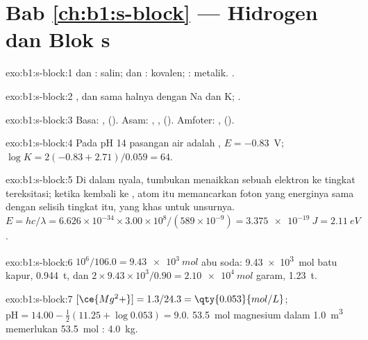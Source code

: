 \section*{Bab \ref{ch:b1:s-block} --- Hidrogen dan Blok s}

\begin{solution}{exo:b1:s-block:1}
 dan : salin;  dan : kovalen;
: metalik. .
\end{solution}

\begin{solution}{exo:b1:s-block:2}
, dan sama halnya dengan Na dan K;
.
\end{solution}

\begin{solution}{exo:b1:s-block:3}
Basa: ,  (). Asam:
, ,  (). Amfoter:
,  ().
\end{solution}

\begin{solution}{exo:b1:s-block:4}
Pada pH 14 pasangan air adalah , $E = -0.83$~V;
$\log K = 2(-0.83 + 2.71)/0.059 = 64$.
\end{solution}

\begin{solution}{exo:b1:s-block:5}
Di dalam nyala, tumbukan menaikkan sebuah elektron ke tingkat tereksitasi;
ketika kembali ke , atom itu memancarkan foton yang
energinya sama dengan selisih tingkat itu, yang khas untuk unsurnya. $E = hc/\lambda = 6.626 \times 10^{-34} \times
3.00 \times 10^8/(589 \times 10^{-9}) = \qty{3.375e-19}{J} = \qty{2.11}{eV}$.
\end{solution}

\begin{solution}{exo:b1:s-block:6}
$10^6/106.0 = \qty{9.43e3}{mol}$ abu soda: \qty{9.43e3}{mol} batu kapur,
\qty{0.944}{t}, dan $2 \times 9.43 \times 10^3/0.90 =
\qty{2.10e4}{mol}$ garam, \qty{1.23}{t}.
\end{solution}

\begin{solution}{exo:b1:s-block:7}
$[\ce{Mg^2+}] = 1.3/24.3 = \qty{0.053}{mol/L}$; $\mathrm{pH} = 14.00 -
\frac12(11.25 + \log 0.053) = 9.0$. \qty{53.5}{mol} magnesium dalam
\qty{1.0}{m^3} memerlukan \qty{53.5}{mol} : \qty{4.0}{kg}.
\end{solution}

